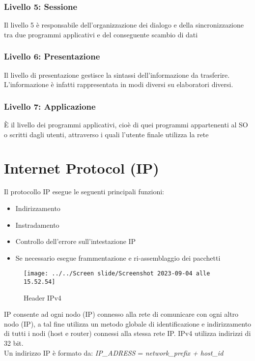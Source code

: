 \documentclass[italian,12pt,a4paper]{article}
\begin{document}
\subsubsection{Livello 5: Sessione}
Il livello 5 è responsabile dell'organizzazione dei dialogo e della sincronizzazione tra due programmi applicativi e del conseguente scambio di dati
\subsubsection{Livello 6: Presentazione}
Il livello di presentazione gestisce la sintassi dell'informazione da trasferire. L'informazione è infatti rappresentata in modi diversi su elaboratori diversi.
\subsubsection{Livello 7: Applicazione}
È il livello dei programmi applicativi, cioè di quei programmi appartenenti al SO o scritti dagli utenti, attraverso i quali l'utente finale utilizza la rete
\section{Internet Protocol (IP)}
Il protocollo IP esegue le seguenti principali funzioni:
\begin{itemize}
	\item Indirizzamento
	\item Instradamento
	\item Controllo dell'errore sull'intestazione IP
	\item Se necessario esegue frammentazione e ri-assemblaggio dei pacchetti 
\end{itemize}
\begin{figure}[h!]
	\centering
	\texttt{[image: ../../Screen slide/Screenshot 2023-09-04 alle 15.52.54]}
	\caption{Header IPv4}
\end{figure}
IP consente ad ogni nodo (IP) connesso alla rete di comunicare con ogni altro nodo (IP), a tal fine utilizza un metodo globale di identificazione e indirizzamento di tutti i nodi (host e router) connessi alla stessa rete IP. IPv4 utilizza indirizzi di 32 bit.\\
Un indirizzo IP è formato da: \textit{IP\_ADRESS} = \textit{network\_prefix + host\_id}
\end{document}

